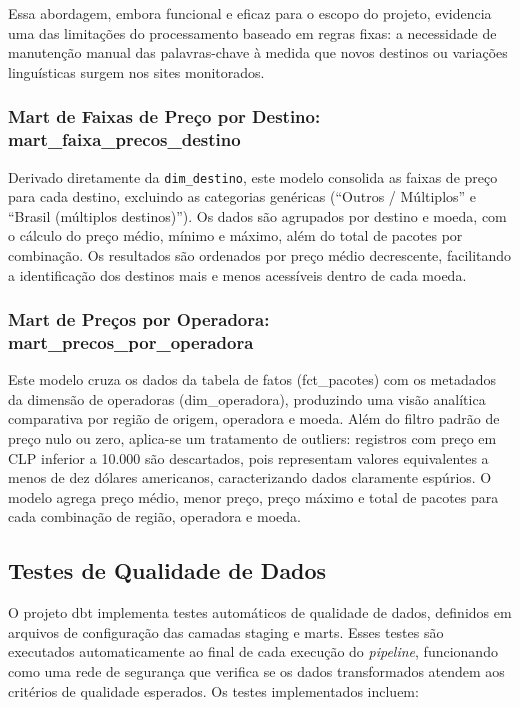 Essa abordagem, embora funcional e eficaz para o escopo do projeto, evidencia uma das
limitações do processamento baseado em regras fixas: a necessidade de manutenção manual
das palavras-chave à medida que novos destinos ou variações linguísticas surgem nos
sites monitorados.

\subsubsection{Mart de Faixas de Preço por Destino: mart\_faixa\_precos\_destino}

Derivado diretamente da \texttt{dim\_destino}, este modelo consolida as faixas de preço
para cada destino, excluindo as categorias genéricas (``Outros / Múltiplos'' e
``Brasil (múltiplos destinos)''). Os dados são agrupados por destino e moeda, com o
cálculo do preço médio, mínimo e máximo, além do total de pacotes por combinação.
Os resultados são ordenados por preço médio decrescente, facilitando a identificação
dos destinos mais e menos acessíveis dentro de cada moeda.

\subsubsection{Mart de Preços por Operadora: mart\_precos\_por\_operadora}

Este modelo cruza os dados da tabela de fatos (fct\_pacotes) com os metadados
da dimensão de operadoras (dim\_operadora), produzindo uma visão analítica
comparativa por região de origem, operadora e moeda. Além do filtro padrão de preço
nulo ou zero, aplica-se um tratamento de outliers: registros com preço em CLP inferior
a 10.000 são descartados, pois representam valores equivalentes a menos de dez dólares
americanos, caracterizando dados claramente espúrios. O modelo agrega preço médio,
menor preço, preço máximo e total de pacotes para cada combinação de região, operadora
e moeda.

\subsection{Testes de Qualidade de Dados}

O projeto dbt implementa testes automáticos de qualidade de dados, definidos em
arquivos de configuração das camadas staging e marts. Esses testes são executados
automaticamente ao final de cada execução do \textit{pipeline}, funcionando como uma
rede de segurança que verifica se os dados transformados atendem aos critérios de
qualidade esperados. Os testes implementados incluem:

